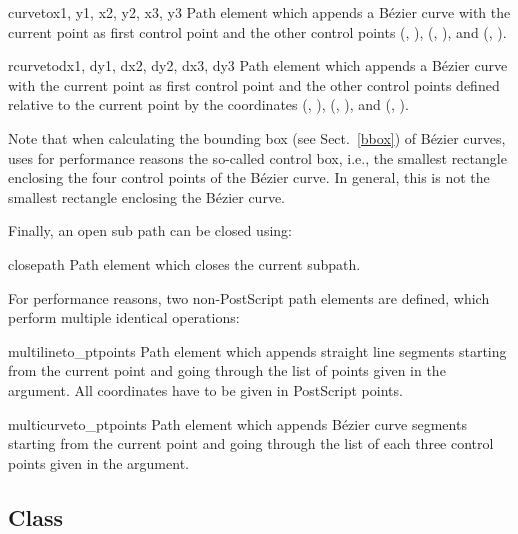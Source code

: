 \begin{classdesc}{curveto}{x1, y1, x2, y2, x3, y3}
Path element which appends a B\'ezier curve with
the current point as first control point and the other control points
(, ), (, ), and (, ).
\end{classdesc}

\begin{classdesc}{rcurveto}{dx1, dy1, dx2, dy2, dx3, dy3}
Path element which appends a B\'ezier curve with
the current point as first control point and the other control points
defined relative to the current point by the coordinates
(, ), (, ), and (, ).
\end{classdesc}

Note that when calculating the bounding box (see Sect.~\ref{bbox}) of
B\'ezier curves, \PyX{} uses for performance reasons the so-called
control box, i.e., the smallest rectangle enclosing the four control
points of the B\'ezier curve. In general, this is not the smallest
rectangle enclosing the B\'ezier curve.

Finally, an open sub path can be closed using:

\begin{classdesc}{closepath}{}
Path element which closes the current subpath.
\end{classdesc}

For performance reasons, two non-PostScript path elements are defined, 
which perform multiple identical operations:

\begin{classdesc}{multilineto_pt}{points}
Path element which appends straight line segments starting from
the current point and going through the list of points given 
in the  argument. All coordinates have to 
be given in PostScript points.
\end{classdesc}

\begin{classdesc}{multicurveto_pt}{points}
Path element which appends B\'ezier curve segments starting from
the current point and going through the list of each three control
points given in the  argument.
\end{classdesc}


\subsection{Class }

